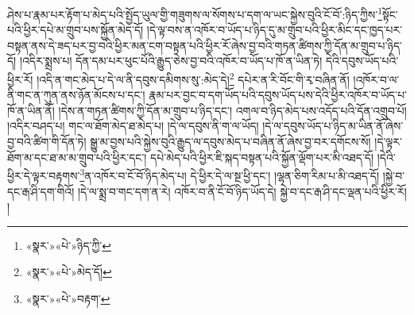 ཤེས་པ་རྣམ་པར་རྟོག་པ་མེད་པའི་སྤྱོད་ཡུལ་གྱི་གཟུགས་ལ་སོགས་པ་དག་ལ་ཡང་སྐྱེས་བུའི་ངོ་བོ་:ཉིད་ཀྱིས་\footnote{«སྣར་»«པེ་»ཉིད་ཀྱི་}སྟོང་པའི་ཕྱིར་དཔེ་མ་གྲུབ་པས་སྐྱོན་མེད་དོ། །དེ་ལྟ་བས་ན་འཁོར་བ་ཡོད་པ་ཉིད་དུ་མ་གྲུབ་པའི་ཕྱིར་མིང་དང་ཁྱད་པར་བསྟན་ནས་དེ་ཟད་པར་བྱ་བའི་ཕྱིར་མན་ངག་བསྟན་པའི་ཕྱིར་རོ་ཞེས་བྱ་བའི་གཏན་ཚིགས་ཀྱི་དོན་མ་གྲུབ་པ་ཉིད་དོ། །འདིར་སྨྲས་པ། དོན་དམ་པར་ཕུང་པོའི་རྒྱུད་ཅེས་བྱ་བའི་འཁོར་བ་ཡོད་པ་ཁོ་ན་ཡིན་ཏེ། དེའི་དབུས་ཡོད་པའི་ཕྱིར་རོ། །འདི་ན་གང་མེད་པ་དེ་ལ་ནི་དབུས་དམིགས་སུ་:མེད་དེ།\footnote{«སྣར་»«པེ་»མེད་དོ།} དཔེར་ན་རི་བོང་གི་རྭ་བཞིན་ནོ། །འཁོར་བ་ལ་ནི་གང་ན་ཀུན་ནས་ཉོན་མོངས་པ་དང་། རྣམ་པར་བྱང་བ་དག་ཡོད་པའི་དབུས་ཡོད་པས་དེའི་ཕྱིར་འཁོར་བ་ཡོད་པ་ཁོ་ན་ཡིན་ནོ། །དེས་ན་གཏན་ཚིགས་ཀྱི་དོན་མ་གྲུབ་པ་ཉིད་དང་། འགལ་བ་ཉིད་མེད་པས་འདོད་པའི་དོན་འགྲུབ་པོ། །འདིར་བཤད་པ། གང་ལ་ཐོག་མེད་ཐ་མེད་པ། །དེ་ལ་དབུས་ནི་ག་ལ་ཡོད། །དེ་ལ་དབུས་ཡོད་པ་ཉིད་མ་ཡིན་ནོ་ཞེས་བྱ་བའི་ཚིག་གི་དོན་ཏེ། སྒྱུ་མ་བྱས་པའི་སྐྱེས་བུའི་རྒྱུད་ལ་དབུས་མེད་པ་བཞིན་ནོ་ཞེས་བྱ་བར་དགོངས་སོ། །དེ་ལྟར་ཐོག་མ་དང་ཐ་མ་མ་གྲུབ་པའི་ཕྱིར་དང་། དཔེ་མེད་པའི་ཕྱིར་ཇི་སྐད་བསྟན་པའི་སྐྱོན་ལྡོག་པར་མི་འཐད་དོ། །དེའི་ཕྱིར་དེ་ལྟར་བརྟགས་\footnote{«སྣར་»«པེ་»བརྟག་}ན་འཁོར་བ་ངོ་བོ་ཉིད་མེད་པ། དེ་ཕྱིར་དེ་ལ་སྔ་ཕྱི་དང་། །ལྷན་ཅིག་རིམ་པ་མི་འཐད་དོ། །སྐྱེ་བ་དང་རྒ་ཤི་དག་གིའོ། །དེ་ལ་སྨྲ་བ་གང་དག་ན་རེ། འཁོར་བ་ནི་ངོ་བོ་ཉིད་ཡོད་དེ། སྐྱེ་བ་དང་རྒ་ཤི་དང་ལྡན་པའི་ཕྱིར་རོ། །

